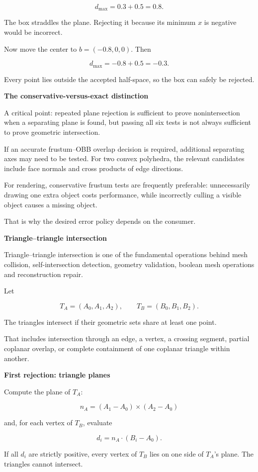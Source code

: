 \[
d_{\max}=0.3+0.5=0.8.
\]

The box straddles the plane. Rejecting it because its minimum \(x\) is negative would be incorrect.

Now move the center to \(b=(-0.8,0,0)\). Then

\[
d_{\max}=-0.8+0.5=-0.3.
\]

Every point lies outside the accepted half-space, so the box can safely be rejected.

\textbf{The conservative-versus-exact distinction}

A critical point: repeated plane rejection is sufficient to prove nonintersection when a separating plane is found, but passing all six tests is not always sufficient to prove geometric intersection.

If an accurate frustum--OBB overlap decision is required, additional separating axes may need to be tested. For two convex polyhedra, the relevant candidates include face normals and cross products of edge directions.

For rendering, conservative frustum tests are frequently preferable: unnecessarily drawing one extra object costs performance, while incorrectly culling a visible object causes a missing object.

That is why the desired error policy depends on the consumer.

\textbf{Triangle--triangle intersection}

Triangle--triangle intersection is one of the fundamental operations behind mesh collision, self-intersection detection, geometry validation, boolean mesh operations and reconstruction repair.

Let

\[
T_A=(A_0,A_1,A_2),\qquad T_B=(B_0,B_1,B_2).
\]

The triangles intersect if their geometric sets share at least one point.

That includes intersection through an edge, a vertex, a crossing segment, partial coplanar overlap, or complete containment of one coplanar triangle within another.

\textbf{First rejection: triangle planes}

Compute the plane of \(T_A\):

\[
n_A=(A_1-A_0)\times(A_2-A_0)
\]

and, for each vertex of \(T_B\), evaluate

\[
d_i=n_A\cdot(B_i-A_0).
\]

If all \(d_i\) are strictly positive, every vertex of \(T_B\) lies on one side of \(T_A\)'s plane. The triangles cannot intersect.

